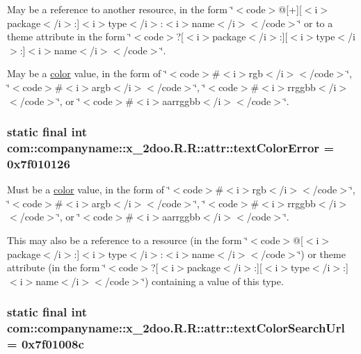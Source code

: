 May be a reference to another resource, in the form \char`\"{}$<$code$>$@\mbox{[}+\mbox{]}\mbox{[}$<$i$>$package$<$/i$>$:\mbox{]}$<$i$>$type$<$/i$>$:$<$i$>$name$<$/i$>$$<$/code$>$\char`\"{} or to a theme attribute in the form \char`\"{}$<$code$>$?\mbox{[}$<$i$>$package$<$/i$>$:\mbox{]}\mbox{[}$<$i$>$type$<$/i$>$:\mbox{]}$<$i$>$name$<$/i$>$$<$/code$>$\char`\"{}. 

May be a \hyperlink{classcom_1_1companyname_1_1x__2doo_1_1_r_1_1color}{color} value, in the form of \char`\"{}$<$code$>$\#$<$i$>$rgb$<$/i$>$$<$/code$>$\char`\"{}, \char`\"{}$<$code$>$\#$<$i$>$argb$<$/i$>$$<$/code$>$\char`\"{}, \char`\"{}$<$code$>$\#$<$i$>$rrggbb$<$/i$>$$<$/code$>$\char`\"{}, or \char`\"{}$<$code$>$\#$<$i$>$aarrggbb$<$/i$>$$<$/code$>$\char`\"{}. \hypertarget{classcom_1_1companyname_1_1x__2doo_1_1_r_1_1attr_f8178821179df9f3f3dddffaa768eb89}{
\subsubsection[{textColorError}]{\setlength{\rightskip}{0pt plus 5cm}static final int com::companyname::x\_\-2doo.R.R::attr::textColorError = 0x7f010126}}
\label{classcom_1_1companyname_1_1x__2doo_1_1_r_1_1attr_f8178821179df9f3f3dddffaa768eb89}


Must be a \hyperlink{classcom_1_1companyname_1_1x__2doo_1_1_r_1_1color}{color} value, in the form of \char`\"{}$<$code$>$\#$<$i$>$rgb$<$/i$>$$<$/code$>$\char`\"{}, \char`\"{}$<$code$>$\#$<$i$>$argb$<$/i$>$$<$/code$>$\char`\"{}, \char`\"{}$<$code$>$\#$<$i$>$rrggbb$<$/i$>$$<$/code$>$\char`\"{}, or \char`\"{}$<$code$>$\#$<$i$>$aarrggbb$<$/i$>$$<$/code$>$\char`\"{}. 

This may also be a reference to a resource (in the form \char`\"{}$<$code$>$@\mbox{[}$<$i$>$package$<$/i$>$:\mbox{]}$<$i$>$type$<$/i$>$:$<$i$>$name$<$/i$>$$<$/code$>$\char`\"{}) or theme attribute (in the form \char`\"{}$<$code$>$?\mbox{[}$<$i$>$package$<$/i$>$:\mbox{]}\mbox{[}$<$i$>$type$<$/i$>$:\mbox{]}$<$i$>$name$<$/i$>$$<$/code$>$\char`\"{}) containing a value of this type. \hypertarget{classcom_1_1companyname_1_1x__2doo_1_1_r_1_1attr_30e023e27383c97ab825e2d25f715684}{
\subsubsection[{textColorSearchUrl}]{\setlength{\rightskip}{0pt plus 5cm}static final int com::companyname::x\_\-2doo.R.R::attr::textColorSearchUrl = 0x7f01008c}}
\label{classcom_1_1companyname_1_1x__2doo_1_1_r_1_1attr_30e023e27383c97ab825e2d25f715684}


